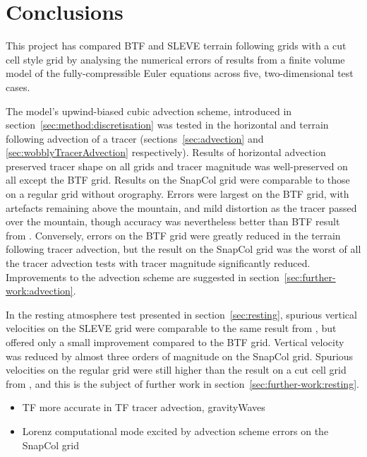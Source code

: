 \chapter{Conclusions}
This project has compared BTF and SLEVE terrain following grids with a cut cell style grid by analysing the numerical errors of results from a finite volume model of the fully-compressible Euler equations across five, two-dimensional test cases.

The model's upwind-biased cubic advection scheme, introduced in section~\ref{sec:method:discretisation} was tested in the horizontal and terrain following advection of a tracer (sections~\ref{sec:advection} and \ref{sec:wobblyTracerAdvection} respectively).  Results of horizontal advection preserved tracer shape on all grids and tracer magnitude was well-preserved on all except the BTF grid.  Results on the SnapCol grid were comparable to those on a regular grid without orography.  Errors were largest on the BTF grid, with artefacts remaining above the mountain, and mild distortion as the tracer passed over the mountain, though accuracy was nevertheless better than BTF result from \textcite{schaer2002}.  Conversely, errors on the BTF grid were greatly reduced in the terrain following tracer advection, but the result on the SnapCol grid was the worst of all the tracer advection tests with tracer magnitude significantly reduced.  Improvements to the advection scheme are suggested in section~\ref{sec:further-work:advection}.

In the resting atmosphere test presented in section~\ref{sec:resting}, spurious vertical velocities on the SLEVE grid were comparable to the same result from \textcite{schaer2002}, but offered only a small improvement compared to the BTF grid.  Vertical velocity was reduced by almost three orders of magnitude on the SnapCol grid.  Spurious velocities on the regular grid were still higher than the result on a cut cell grid from \textcite{good2013}, and this is the subject of further work in section~\ref{sec:further-work:resting}.

\begin{itemize}
\item TF more accurate in TF tracer advection, gravityWaves
\item Lorenz computational mode excited by advection scheme errors on the SnapCol grid
\end{itemize}
